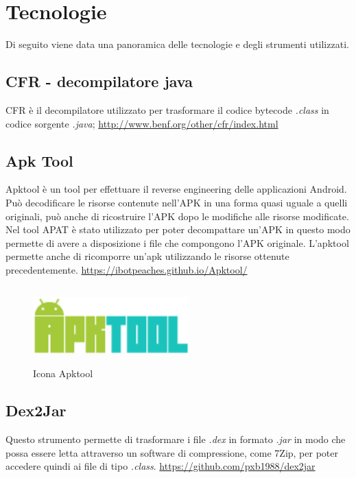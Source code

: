 
\section{Tecnologie}\label{sec:tecnologie}
Di seguito viene data una panoramica delle tecnologie e degli strumenti utilizzati.
\subsection*{CFR - decompilatore java}
CFR è il decompilatore utilizzato per trasformare il codice bytecode \textit{.class} in codice sorgente \textit{.java};
\url{http://www.benf.org/other/cfr/index.html}

\subsection*{Apk Tool}
Apktool è un tool per effettuare il reverse engineering delle applicazioni Android.
Può decodificare le risorse contenute nell'APK in una forma quasi uguale a quelli originali, può anche di ricostruire l'APK dopo le modifiche alle risorse modificate.
Nel tool APAT è stato utilizzato per poter decompattare un'APK in questo modo permette di avere a disposizione i file che compongono l'APK originale.
L'apktool permette anche di ricomporre un'apk utilizzando le risorse ottenute precedentemente.
\url{https://ibotpeaches.github.io/Apktool/}
\begin{figure}[H]
    \centering
    \includegraphics[width=6cm, height=3cm]{./immagini/apktool.png}
    \caption{Icona Apktool}\label{fig:apktool}
\end{figure}

\subsection*{Dex2Jar}
Questo strumento permette di trasformare i file \textit{.dex} in formato \textit{.jar} in modo che possa essere letta attraverso un software di compressione, come 7Zip, per poter accedere quindi ai file di tipo \textit{.class}.
\url{https://github.com/pxb1988/dex2jar}

